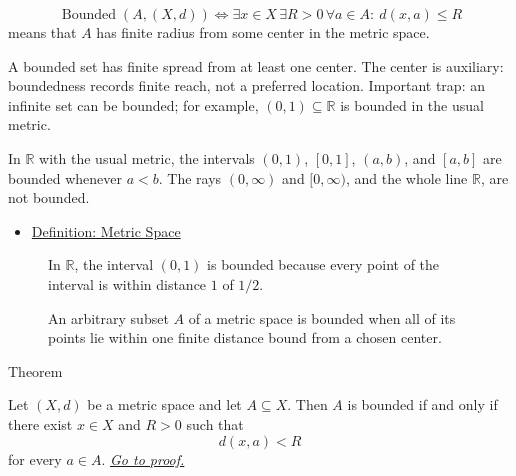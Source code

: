 \begin{remark*}
\[
\operatorname{Bounded}(A,(X,d))
\Longleftrightarrow
\exists x\in X\,\exists R>0\,\forall a\in A{:}\ d(x,a)\leq R
\]
means that \(A\) has finite radius from some center in the metric space.
\end{remark*}

\begin{remark*}[Interpretation]
A bounded set has finite spread from at least one center.  The center is
auxiliary: boundedness records finite reach, not a preferred location.
Important trap: an infinite set can be bounded; for example,
\((0,1)\subseteq\mathbb{R}\) is bounded in the usual metric.
\end{remark*}

\begin{remark*}[Examples]
In \(\mathbb{R}\) with the usual metric, the intervals \((0,1)\),
\([0,1]\), \((a,b)\), and \([a,b]\) are bounded whenever \(a<b\).  The rays
\((0,\infty)\) and \([0,\infty)\), and the whole line \(\mathbb{R}\), are not
bounded.
\end{remark*}

\begin{dependencies}
\begin{itemize}
  \item \hyperref[def:metric-space]{Definition: Metric Space}
\end{itemize}
\end{dependencies}

\begin{figure}[htbp]
\centering

\caption{In \(\mathbb{R}\), the interval \((0,1)\) is bounded because every
point of the interval is within distance \(1\) of \(1/2\).}
\label{fig:bounded-interval-r}
\end{figure}

\begin{figure}[htbp]
\centering

\caption{An arbitrary subset \(A\) of a metric space is bounded when all of
its points lie within one finite distance bound from a chosen center.}
\label{fig:bounded-arbitrary-set}
\end{figure}

\begin{theorembox}{Theorem}
\begin{theorem}
\label{thm:metric-equivalent-boundedness-criterion}
Let \((X,d)\) be a metric space and let \(A\subseteq X\).  Then \(A\) is
bounded if and only if there exist \(x\in X\) and \(R>0\) such that
\[
  d(x,a)<R
\]
for every \(a\in A\).
\hyperref[prf:metric-equivalent-boundedness-criterion]{\textit{Go to proof.}}
\end{theorem}
\end{theorembox}

